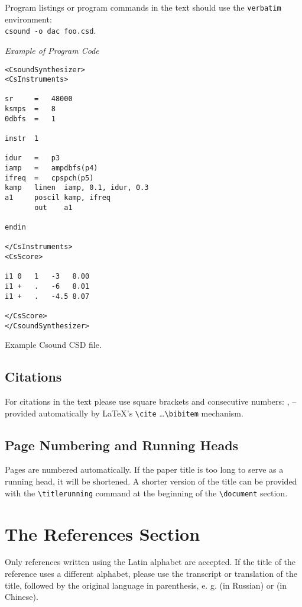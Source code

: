 \documentclass[runningheads,a4paper]{llncs}
\begin{document}
Program listings or program commands in the text should use the \verb+verbatim+
environment: \\ \verb+csound -o dac foo.csd+.

\medskip

\noindent
{\it Example of Program Code}
	\begin{verbatim}
<CsoundSynthesizer>
<CsInstruments>

sr     =   48000
ksmps  =   8
0dbfs  =   1

instr  1

idur   =   p3
iamp   =   ampdbfs(p4)
ifreq  =   cpspch(p5)
kamp   linen  iamp, 0.1, idur, 0.3
a1     poscil kamp, ifreq
       out    a1

endin

</CsInstruments>
<CsScore>

i1 0   1   -3   8.00
i1 +   .   -6   8.01
i1 +   .   -4.5 8.07

</CsScore>
</CsoundSynthesizer>
	\end{verbatim}
%
\noindent
{\small Example Csound CSD file.}

\subsection{Citations}

For citations in the text please use square brackets and consecutive
numbers: \cite{jour}, \cite{proceeding} -- provided automatically
by \LaTeX 's \verb|\cite| \dots\verb|\bibitem| mechanism.

\subsection{Page Numbering and Running Heads}

Pages are numbered automatically. If the paper title is too long to serve
as a running head, it will be shortened. A shorter version of the title can
be provided with the \verb+\titlerunning+ command at the beginning of the
\verb+\document+ section.


\section{The References Section}\label{references}

Only references written using the Latin alphabet are accepted. If the title of
the reference uses a different alphabet, please use the transcript or
translation of the title, followed by the original language in parenthesis, e.
g. (in Russian) or (in Chinese).
\end{document}
